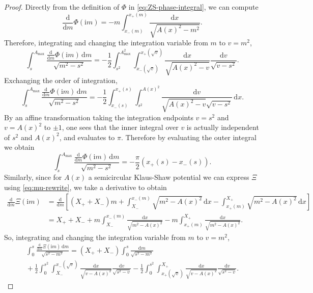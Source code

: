 \documentclass[10pt,a4paper]{amsart}
\newcommand{\dd}{\mathrm{d}}
\newcommand{\ii}{\mathrm{i}}
\newcommand{\phaseint}{\Phi}
\newcommand{\tailint}{\Xi}
\begin{document}
\begin{proof}
Directly from the definition of $\phaseint$ in \eqref{eq:ZS-phase-integral}, 
we can compute
\begin{equation}
\frac{\dd}{\dd m}\phaseint(\ii m) = -m\int_{x_-(m)}^{x_+(m)}\frac{\dd x}{\sqrt{A(x)^2-m^2}}.
\end{equation}
Therefore, integrating and changing the integration variable from $m$ to $v=m^2$,
\begin{equation}
\int_s^{A_\mathrm{max}}\frac{\displaystyle\frac{\dd}{\dd m}\phaseint(\ii m)\,\dd m}{\sqrt{m^2-s^2}} = 
-\frac{1}{2}\int_{s^2}^{A_\mathrm{max}^2}\int_{x_-(\sqrt{v})}^{x_+(\sqrt{v})}\frac{\dd x}{\sqrt{A(x)^2-v}}\frac{\dd v}{\sqrt{v-s^2}}.
\end{equation}
Exchanging the order of integration,
\begin{equation}
\int_s^{A_\mathrm{max}}\frac{\displaystyle\frac{\dd}{\dd m}\phaseint(\ii m)\,\dd m}{\sqrt{m^2-s^2}} = -\frac{1}{2}\int_{x_-(s)}^{x_+(s)}\int_{s^2}^{A(x)^2}\frac{\dd v}{\sqrt{A(x)^2-v}\sqrt{v-s^2}}\,\dd x.
\end{equation}
By an affine transformation taking the integration endpoints $v=s^2$ and $v=A(x)^2$ to $\pm 1$, one sees that the inner integral over $v$ is actually independent of $s^2$ and $A(x)^2$, and evaluates to $\pi$. 
Therefore by evaluating the outer integral we obtain
\begin{equation}
\int_s^{A_\mathrm{max}}\frac{\displaystyle\frac{\dd}{\dd m}\phaseint(\ii m)\,\dd m}{\sqrt{m^2-s^2}} = -\frac{\pi}{2}(x_+(s)-x_-(s)).
\label{eq:Psi-integral}
\end{equation}
Similarly, since for $A(x)$ a semicircular Klaus-Shaw potential we can express $\tailint$ using \eqref{eq:mu-rewrite},
we take a derivative to obtain
\begin{align}
\frac{\dd}{\dd m}\tailint(\ii m) &= \frac{\dd}{\dd m}\left[(X_++X_-)m + \int_{X_-}^{x_-(m)}\sqrt{m^2-A(x)^2}\,\dd x -\int_{x_+(m)}^{X_+}\sqrt{m^2-A(x)^2}\,\dd x\right] \nonumber \\
&= X_++X_- + m\int_{X_-}^{x_-(m)}\frac{\dd x}{\sqrt{m^2-A(x)^2}} -m\int_{x_+(m)}^{X_+}\frac{\dd x}{\sqrt{m^2-A(x)^2}}.
\end{align}
So, integrating and changing the integration variable from $m$ to $v=m^2$,
\begin{multline}
\int_0^s\frac{\displaystyle\frac{\dd}{\dd m}\tailint(\ii m)\,\dd m}{\sqrt{s^2-m^2}} = (X_++X_-)\int_0^s\frac{\dd m}{\sqrt{s^2-m^2}} \\
{}+\frac{1}{2}\int_0^{s^2}\int_{X_-}^{x_-(\sqrt{v})}\frac{\dd x}{\sqrt{v-A(x)^2}}\frac{\dd v}{\sqrt{s^2-v}} -\frac{1}{2}\int_0^{s^2}\int_{x_+(\sqrt{v})}^{X_+}\frac{\dd x}{\sqrt{v-A(x)^2}}\frac{\dd v}{\sqrt{s^2-v}}.

\end{multline}
\end{proof}
\end{document}

